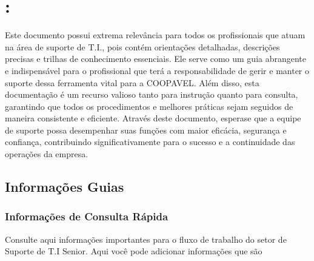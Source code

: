 \documentclass[letterpaper,10pt,portuges]{sphinxmanual}
\begin{document}
\section{:}
\label{\detokenize{index:importancia-do-conteudo}}
\sphinxAtStartPar
Este documento possui extrema relevância para todos os profissionais que atuam na área de suporte de T.I., pois contém orientações detalhadas, descrições precisas e trilhas de conhecimento essenciais. Ele serve como um guia abrangente e indispensável para o profissional que terá a responsabilidade de gerir e manter o suporte dessa ferramenta vital para a COOPAVEL. Além disso, esta documentação é um recurso valioso tanto para instrução quanto para consulta, garantindo que todos os procedimentos e melhores práticas sejam seguidos de maneira consistente e eficiente. Através deste documento, espera\sphinxhyphen{}se que a equipe de suporte possa desempenhar suas funções com maior eficácia, segurança e confiança, contribuindo significativamente para o sucesso e a continuidade das operações da empresa.

\sphinxstepscope


\subsection{Informações Guias}
\label{\detokenize{info:informacoes-guias}}\label{\detokenize{info::doc}}

\subsubsection{Informações de Consulta Rápida}
\label{\detokenize{info:informacoes-de-consulta-rapida}}
\sphinxAtStartPar
Consulte aqui informações importantes para o fluxo de trabalho do setor de Suporte de T.I Senior.
Aqui você pode adicionar informações que são
\end{document}
